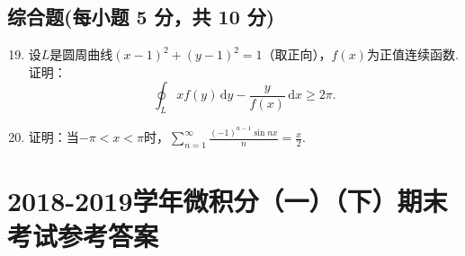 \documentclass[../main.tex]{subfiles}
\begin{document}
\section{综合题(每小题 5 分，共 10 分)}
\begin{enumerate}
    \setcounter{enumi}{18}
    \item 设$L$是圆周曲线$(x-1)^{2}+(y-1)^{2}=1$（取正向），$f(x)$为正值连续函数. 证明：
          \[
              \oint_{L}xf(y)\,\mathrm{d}y-\frac{y}{f(x)}\,\mathrm{d}x\geq2\pi.
          \]
          \vspace{10em}

    \item 证明：当$-\pi<x<\pi$时，$\sum_{n=1}^{\infty}\frac{(-1)^{n-1}\sin nx}{n}=\frac{x}{2}$.
          \vspace{10em}
\end{enumerate}

\chapter{2018-2019学年微积分（一）（下）期末考试参考答案}
\end{document}
